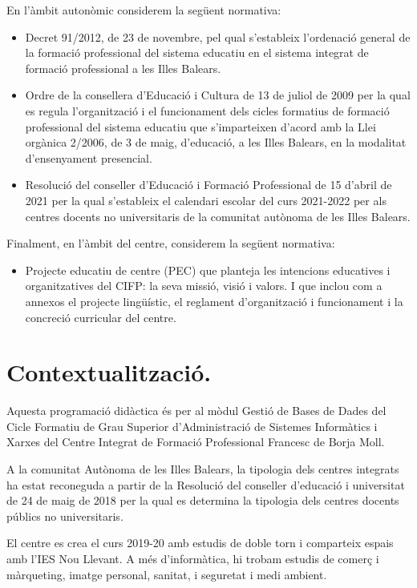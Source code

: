 \documentclass[catalan, a4paper, 12pt, titlepage]{article}
\begin{document}
En l'àmbit autonòmic considerem la següent normativa:
\begin{itemize}
	\item Decret 91/2012, de 23 de novembre, pel qual s'estableix l'ordenació general de la formació professional del sistema educatiu en el sistema integrat de formació professional a les Illes Balears.
	\item Ordre de la consellera d'Educació i Cultura de 13 de juliol de 2009 per la qual es regula l'organització i el funcionament dels cicles formatius de formació professional del sistema educatiu que s'imparteixen d'acord amb la Llei orgànica 2/2006, de 3 de maig, d'educació, a les Illes Balears, en la modalitat d'ensenyament presencial.
	\item Resolució del conseller d’Educació i Formació Professional de 15 d’abril de 2021 per la qual s’estableix el calendari escolar del curs 2021-2022 per als centres docents no universitaris de la comunitat autònoma de les Illes Balears.
\end{itemize}

Finalment, en l'àmbit del centre, considerem la següent normativa:
\begin{itemize}
	\item Projecte educatiu de centre (PEC) que planteja les intencions educatives i organitzatives del CIFP: la seva missió, visió i valors. I que inclou com a annexos el projecte lingüístic, el reglament d'organització i funcionament i la concreció curricular del centre.
\end{itemize}

\section{Contextualització.}
\label{sec:contextualització}

Aquesta programació didàctica és per al mòdul Gestió de Bases de Dades del Cicle Formatiu de Grau Superior d'Administració de Sistemes Informàtics i Xarxes del Centre Integrat de Formació Professional Francesc de Borja Moll. 

A la comunitat Autònoma de les Illes Balears, la tipologia dels centres integrats ha estat reconeguda a partir de la Resolució del conseller d'educació i universitat de 24 de maig de 2018 per la qual es determina la tipologia dels centres docents públics no universitaris.

El centre es crea el curs 2019-20 amb estudis de doble torn i comparteix espais amb l'IES Nou Llevant. A més d'informàtica, hi trobam estudis de comerç i màrqueting, imatge personal, sanitat, i seguretat i medi ambient.
\end{document}
